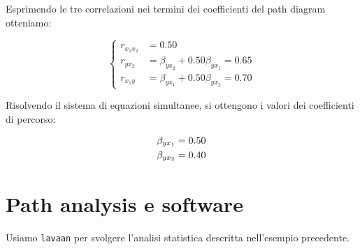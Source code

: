 \documentclass[
  11pt,
]{krantz}
\theoremstyle{definition}
\theoremstyle{definition}
\theoremstyle{definition}
\theoremstyle{definition}
\theoremstyle{remark}
\begin{document}
Esprimendo le tre correlazioni nei termini dei coefficienti del path diagram otteniamo:

\begin{equation} 
\begin{cases} 
r_{x_1x_2} &= 0.50\\ 
r_{yx_2} &= \beta_{yx_2} + 0.50 \beta_{yx_1} = 0.65\\ 
r_{x_1y} &= \beta_{yx_1} +   0.50 \beta_{yx_2} = 0.70
\end{cases}
\end{equation}

Risolvendo il sistema di equazioni simultanee, si ottengono i valori dei coefficienti di percorso:

\begin{equation}
\begin{aligned}
\beta_{yx_1} &= 0.50\notag\\ 
\beta_{yx_2} &= 0.40\notag
\end{aligned}
\end{equation}

\hypertarget{path-analysis-e-software}{%
\section{Path analysis e software}\label{path-analysis-e-software}}

Usiamo \texttt{lavaan} per svolgere l'analisi statistica descritta nell'esempio precedente.
\end{document}
